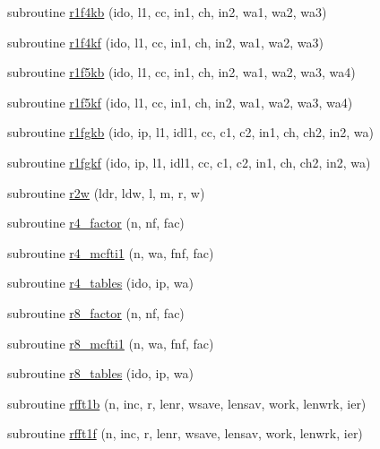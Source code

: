 \begin{DoxyCompactItemize}
\item 
subroutine \mbox{\hyperlink{namespacefftclass_a71f9b9a5e0173f9ddef4dd0fc92e6164}{r1f4kb}} (ido, l1, cc, in1, ch, in2, wa1, wa2, wa3)
\item 
subroutine \mbox{\hyperlink{namespacefftclass_ac2e28efef69b7ac5c599c51dc9be973d}{r1f4kf}} (ido, l1, cc, in1, ch, in2, wa1, wa2, wa3)
\item 
subroutine \mbox{\hyperlink{namespacefftclass_a42f5de07f4eb994cbe15a8526291566b}{r1f5kb}} (ido, l1, cc, in1, ch, in2, wa1, wa2, wa3, wa4)
\item 
subroutine \mbox{\hyperlink{namespacefftclass_acc419931cfa3ec3e19e6264b35e83aae}{r1f5kf}} (ido, l1, cc, in1, ch, in2, wa1, wa2, wa3, wa4)
\item 
subroutine \mbox{\hyperlink{namespacefftclass_aa5cb9e2d3b6aa9d5adcb4144cd17f10e}{r1fgkb}} (ido, ip, l1, idl1, cc, c1, c2, in1, ch, ch2, in2, wa)
\item 
subroutine \mbox{\hyperlink{namespacefftclass_adb327056327448d0a605271d57091578}{r1fgkf}} (ido, ip, l1, idl1, cc, c1, c2, in1, ch, ch2, in2, wa)
\item 
subroutine \mbox{\hyperlink{namespacefftclass_a6d2b5609d651241869584e962d234756}{r2w}} (ldr, ldw, l, m, r, w)
\item 
subroutine \mbox{\hyperlink{namespacefftclass_ad76d163c3f3aec3b5a3bbb3285498ffd}{r4\+\_\+factor}} (n, nf, fac)
\item 
subroutine \mbox{\hyperlink{namespacefftclass_aecf4238ff306578dd37cab143ce6efac}{r4\+\_\+mcfti1}} (n, wa, fnf, fac)
\item 
subroutine \mbox{\hyperlink{namespacefftclass_a882cd8d6eeb407d2b10ee9b3d9fee8b9}{r4\+\_\+tables}} (ido, ip, wa)
\item 
subroutine \mbox{\hyperlink{namespacefftclass_a22bddf5efe99e8dcd5737d2d73ae832f}{r8\+\_\+factor}} (n, nf, fac)
\item 
subroutine \mbox{\hyperlink{namespacefftclass_a89d64713ecbaec08b4d5180fcbc56cea}{r8\+\_\+mcfti1}} (n, wa, fnf, fac)
\item 
subroutine \mbox{\hyperlink{namespacefftclass_a68ac2e6dba058989d5e0d7fbee9aa19f}{r8\+\_\+tables}} (ido, ip, wa)
\item 
subroutine \mbox{\hyperlink{namespacefftclass_a2bdd31e65a4abb79ed9e0eeaa71cee6b}{rfft1b}} (n, inc, r, lenr, wsave, lensav, work, lenwrk, ier)
\item 
subroutine \mbox{\hyperlink{namespacefftclass_ad5aa2059236e01ea65aecda114c3f45f}{rfft1f}} (n, inc, r, lenr, wsave, lensav, work, lenwrk, ier)

\end{DoxyCompactItemize}
